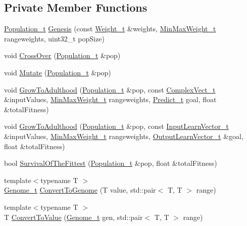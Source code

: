 \subsection*{Private Member Functions}
\begin{DoxyCompactItemize}
\item 
\hyperlink{_soil_math_types_8h_a8d2d4c736cf817d048a2d66dec8b12ec}{Population\+\_\+t} \hyperlink{class_soil_math_1_1_g_a_a96cfe7cc5b3028a66b0136e72ea38cbc}{Genesis} (const \hyperlink{_soil_math_types_8h_ac56ad2b88186620fd0de0d213aa715dd}{Weight\+\_\+t} \&weights, \hyperlink{_soil_math_types_8h_aaa919636507bcd52b19efa301aa80b9a}{Min\+Max\+Weight\+\_\+t} rangeweights, uint32\+\_\+t pop\+Size)
\item 
void \hyperlink{class_soil_math_1_1_g_a_abf408d603b2afb188a6d265eb6309b69}{Cross\+Over} (\hyperlink{_soil_math_types_8h_a8d2d4c736cf817d048a2d66dec8b12ec}{Population\+\_\+t} \&pop)
\item 
void \hyperlink{class_soil_math_1_1_g_a_a489f2afd54086c14f45b654aeec0fe3c}{Mutate} (\hyperlink{_soil_math_types_8h_a8d2d4c736cf817d048a2d66dec8b12ec}{Population\+\_\+t} \&pop)
\item 
void \hyperlink{class_soil_math_1_1_g_a_aff791f50f889beb74e854942f8883b58}{Grow\+To\+Adulthood} (\hyperlink{_soil_math_types_8h_a8d2d4c736cf817d048a2d66dec8b12ec}{Population\+\_\+t} \&pop, const \hyperlink{_soil_math_types_8h_a7567e521c2b2c408dcb62dbff72390f7}{Complex\+Vect\+\_\+t} \&input\+Values, \hyperlink{_soil_math_types_8h_aaa919636507bcd52b19efa301aa80b9a}{Min\+Max\+Weight\+\_\+t} rangeweights, \hyperlink{_soil_math_types_8h_aaeba766195a440b2539f0438d3d41f95}{Predict\+\_\+t} goal, float \&total\+Fitness)
\item 
void \hyperlink{class_soil_math_1_1_g_a_aa39c76b7958bfc80b713389a6f0c6b97}{Grow\+To\+Adulthood} (\hyperlink{_soil_math_types_8h_a8d2d4c736cf817d048a2d66dec8b12ec}{Population\+\_\+t} \&pop, const \hyperlink{_soil_math_types_8h_a45aa81992bf0ddf272907bd4fa0b96cf}{Input\+Learn\+Vector\+\_\+t} \&input\+Values, \hyperlink{_soil_math_types_8h_aaa919636507bcd52b19efa301aa80b9a}{Min\+Max\+Weight\+\_\+t} rangeweights, \hyperlink{_soil_math_types_8h_a2d8b5a261688166d724b68addd8561e6}{Output\+Learn\+Vector\+\_\+t} \&goal, float \&total\+Fitness)
\item 
bool \hyperlink{class_soil_math_1_1_g_a_ac2c10631815408d044738f678c67e98b}{Survival\+Of\+The\+Fittest} (\hyperlink{_soil_math_types_8h_a8d2d4c736cf817d048a2d66dec8b12ec}{Population\+\_\+t} \&pop, float \&total\+Fitness)
\item 
{\footnotesize template$<$typename T $>$ }\\\hyperlink{_soil_math_types_8h_a58f6ab36d2cb0527a73caec36d14a0e0}{Genome\+\_\+t} \hyperlink{class_soil_math_1_1_g_a_a360250150f348af461259baf41477899}{Convert\+To\+Genome} (T value, std\+::pair$<$ T, T $>$ range)
\item 
{\footnotesize template$<$typename T $>$ }\\T \hyperlink{class_soil_math_1_1_g_a_aa4a6f59bd2e88d432a94d0159b8e8914}{Convert\+To\+Value} (\hyperlink{_soil_math_types_8h_a58f6ab36d2cb0527a73caec36d14a0e0}{Genome\+\_\+t} gen, std\+::pair$<$ T, T $>$ range)
\end{DoxyCompactItemize}
